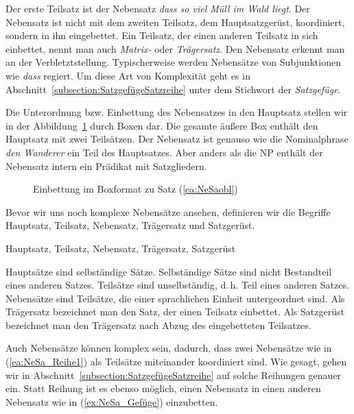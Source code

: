 Der erste Teilsatz ist der Nebensatz \textit{dass so viel Müll im Wald liegt}. Der Nebensatz ist nicht mit dem zweiten Teilsatz, dem Hauptsatzgerüst, koordiniert, sondern in ihn eingebettet. Ein Teilsatz, der einen anderen Teilsatz in sich einbettet, nennt man auch \textit{Matrix-} oder \textit{Trägersatz}. Den Nebensatz erkennt man an der Verbletztstellung. Typischerweise werden Nebensätze von Subjunktionen wie \textit{dass} regiert. Um diese Art von Komplexität geht es in Abschnitt~\ref{subsection:SatzgefügeSatzreihe} unter dem Stichwort der \textit{Satzgefüge}.

Die Unterordnung bzw. Einbettung des Nebensatzes in den Hauptsatz stellen wir in der Abbildung~\ref{fig:NeSainHS} durch Boxen dar. Die gesamte äußere Box enthält den Hauptsatz mit zwei Teilsätzen. Der Nebensatz ist genauso wie die Nominalphrase \textit{den Wanderer} ein Teil des Hauptsatzes. Aber anders als die NP enthält der Nebensatz intern ein Prädikat mit Satzgliedern.  

\begin{figure}

        
\caption{\label{fig:NeSainHS} Einbettung im Boxformat zu Satz (\ref{ea:NeSaobl})}
\end{figure}%

\largerpage
Bevor wir uns noch komplexe Nebensätze ansehen, definieren wir die Begriffe Hauptsatz, Teilsatz, Nebensatz, Trägersatz und Satzgerüst.

\begin{Definition}{Hauptsatz, Teilsatz, Nebensatz, Trägersatz, Satzgerüst}
    
\noindent 
Hauptsätze sind selbständige Sätze. Selbständige Sätze sind nicht Bestandteil eines anderen Satzes.
Teilsätze sind unselbständig, d.\,h. Teil eines anderen Satzes.
Nebensätze sind Teilsätze, die einer sprachlichen Einheit untergeordnet sind. Als Trägersatz bezeichnet man den Satz, der einen Teilsatz einbettet. Als Satzgerüst bezeichnet man den Trägersatz nach Abzug des eingebetteten Teilsatzes. 
\end{Definition}



Auch Nebensätze können komplex sein, \zB dadurch, dass zwei Nebensätze wie in (\ref{ea:NeSa_Reihe1}) als Teilsätze miteinander koordiniert sind. Wie gesagt, gehen wir in Abschnitt~\ref{subsection:SatzgefügeSatzreihe} auf solche Reihungen genauer ein. Statt Reihung ist es ebenso möglich, einen Nebensatz in einen anderen Nebensatz wie in (\ref{ex:NeSa_Gefüge}) einzubetten.

